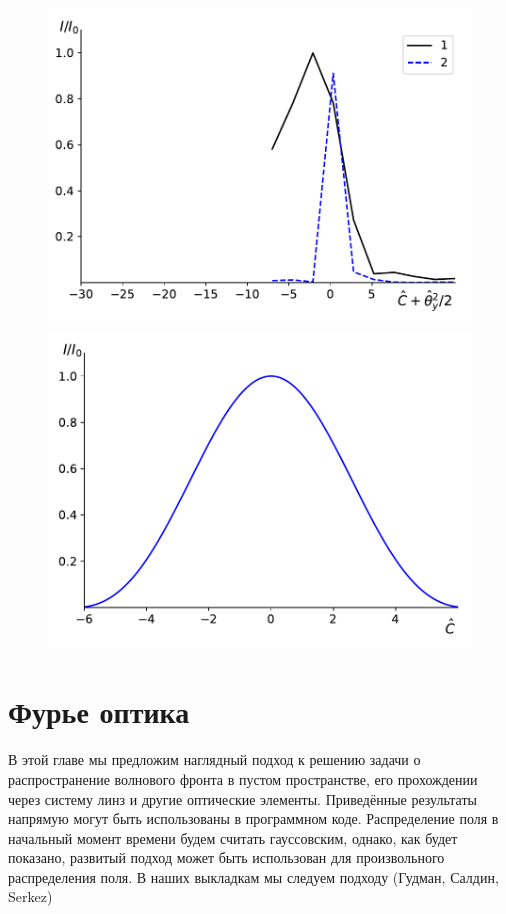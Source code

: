 \documentclass[14pt,a4paper]{extarticle}
\numberwithin{equation}{section}
\begin{document}
\begin{figure}
	\centering  
	\begin{minipage}{0.49\textwidth}
		\centering
		\includegraphics[width=\textwidth]{pic/spec_integ_emittance.pdf}
		\caption{}
		\label{fig:2spec_emittance_and_single}
	\end{minipage}\hfill
	\begin{minipage}{0.49\textwidth}
		\centering
		\includegraphics[width=\textwidth]{pic/spec_C.pdf}
		\caption{}
		\label{fig:spec}
	\end{minipage}    
\end{figure}
\section{Фурье оптика}
В этой главе мы предложим наглядный подход к решению задачи о распространение волнового фронта в пустом пространстве, его прохождении через систему линз и другие оптические элементы. Приведённые результаты напрямую могут быть использованы в программном коде. Распределение поля в начальный момент времени будем считать гауссовским, однако, как будет показано, развитый подход может быть использован для произвольного распределения поля. В наших выкладкам мы следуем подходу (Гудман, Салдин, Serkez)
\end{document}
